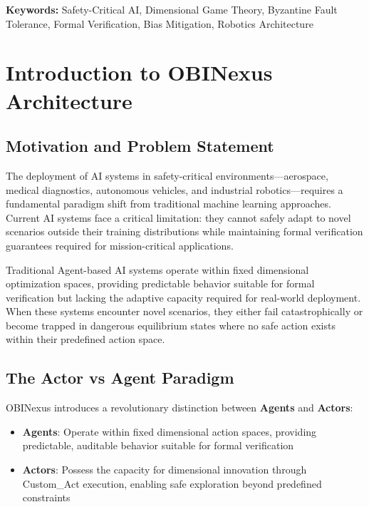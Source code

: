 \documentclass[12pt,a4paper]{article}
\begin{document}
\textbf{Keywords:} Safety-Critical AI, Dimensional Game Theory, Byzantine Fault Tolerance, Formal Verification, Bias Mitigation, Robotics Architecture

\clearpage

\section{Introduction to OBINexus Architecture}

\subsection{Motivation and Problem Statement}

The deployment of AI systems in safety-critical environments—aerospace, medical diagnostics, autonomous vehicles, and industrial robotics—requires a fundamental paradigm shift from traditional machine learning approaches. Current AI systems face a critical limitation: they cannot safely adapt to novel scenarios outside their training distributions while maintaining formal verification guarantees required for mission-critical applications.

Traditional Agent-based AI systems operate within fixed dimensional optimization spaces, providing predictable behavior suitable for formal verification but lacking the adaptive capacity required for real-world deployment. When these systems encounter novel scenarios, they either fail catastrophically or become trapped in dangerous equilibrium states where no safe action exists within their predefined action space.

\subsection{The Actor vs Agent Paradigm}

OBINexus introduces a revolutionary distinction between \textbf{Agents} and \textbf{Actors}:

\begin{itemize}
    \item \textbf{Agents}: Operate within fixed dimensional action spaces, providing predictable, auditable behavior suitable for formal verification
    \item \textbf{Actors}: Possess the capacity for dimensional innovation through Custom\_Act execution, enabling safe exploration beyond predefined constraints
\end{itemize}
\end{document}
